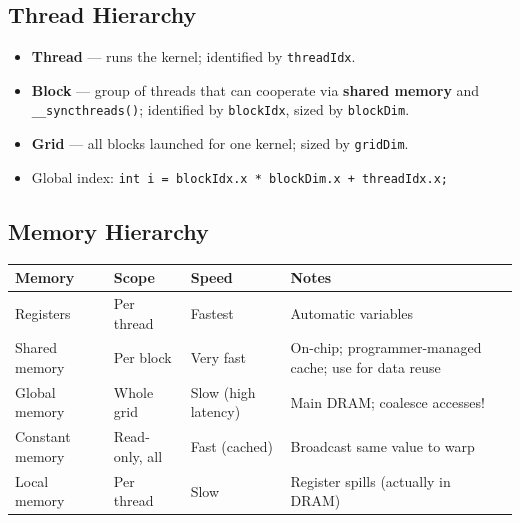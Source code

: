 \documentclass[11pt,a4paper]{article}
\begin{document}
\subsection{Thread Hierarchy}
\begin{center}
\end{center}
\begin{itemize}[leftmargin=*, itemsep=2pt]
  \item \textbf{Thread} --- runs the kernel; identified by \texttt{threadIdx}.
  \item \textbf{Block} --- group of threads that can cooperate via \textbf{shared memory} and \texttt{\_\_syncthreads()}; identified by \texttt{blockIdx}, sized by \texttt{blockDim}.
  \item \textbf{Grid} --- all blocks launched for one kernel; sized by \texttt{gridDim}.
  \item Global index: \texttt{int i = blockIdx.x * blockDim.x + threadIdx.x;}
\end{itemize}

\subsection{Memory Hierarchy}
\begin{longtable}{@{}p{2.9cm}p{2.6cm}p{2.4cm}p{5.3cm}@{}}
\toprule
\rowcolor{primary!15}
\textbf{Memory} & \textbf{Scope} & \textbf{Speed} & \textbf{Notes} \\
\midrule
\endhead
Registers & Per thread & Fastest & Automatic variables \\
Shared memory & Per block & Very fast & On-chip; programmer-managed cache; use for data reuse \\
Global memory & Whole grid & Slow (high latency) & Main DRAM; coalesce accesses! \\
Constant memory & Read-only, all & Fast (cached) & Broadcast same value to warp \\
Local memory & Per thread & Slow & Register spills (actually in DRAM) \\
\bottomrule
\end{longtable}
\end{document}
